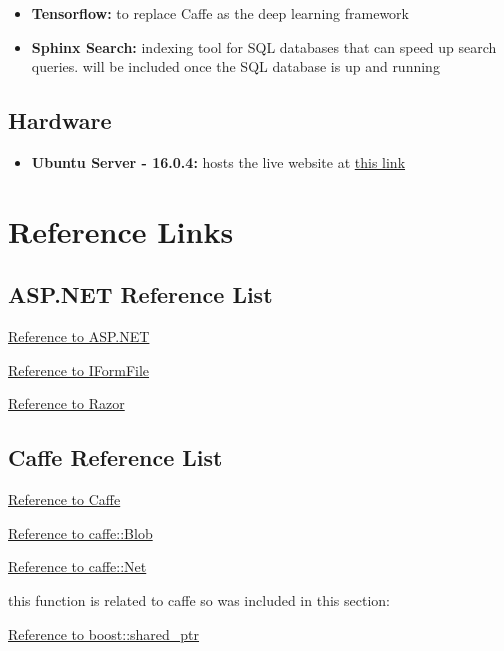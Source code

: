 \documentclass{scrreprt}
\begin{document}
\begin{itemize}
    \item \textbf{Tensorflow:} to replace Caffe as the deep learning framework
    \item \textbf{Sphinx Search:} indexing tool for SQL databases that can speed up search queries. will be included once the SQL database is up and running
\end{itemize}

\section{Hardware}

\begin{itemize}
    \item \textbf{Ubuntu Server - 16.0.4:} hosts the live website at \href{159.203.10.112}{this link}
\end{itemize}

\chapter{Reference Links}

\section{ASP.NET Reference List}

\href{https://docs.microsoft.com/en-us/aspnet/core/mvc/overview}{Reference to ASP.NET}

\href{https://docs.microsoft.com/en-us/aspnet/core/api/microsoft.aspnetcore.http.iformfile}{Reference to IFormFile}

\href{https://docs.microsoft.com/en-us/aspnet/core/mvc/views/razor}{Reference to Razor}

\section{Caffe Reference List}

\href{http://caffe.berkeleyvision.org/doxygen/index.html}{Reference to Caffe}

\href{http://caffe.berkeleyvision.org/doxygen/classcaffe_1_1Blob.html}{Reference to caffe::Blob}

\href{http://caffe.berkeleyvision.org/doxygen/classcaffe_1_1Net.html}{Reference to caffe::Net}

this function is related to caffe so was included in this section:

\href{http://www.boost.org/doc/libs/1_63_0/libs/smart_ptr/shared_ptr.htm}{Reference to boost::shared\_ptr}
\end{document}
